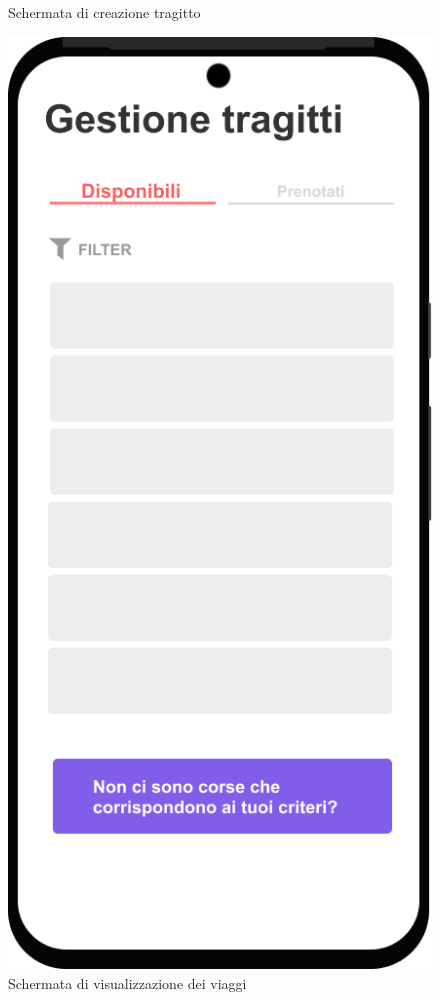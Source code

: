 \begin{figure}[H]
\begin{minipage}{0.45\textwidth}
        \caption{Schermata di creazione tragitto}
        \label{mockUp:createTrip}
    \end{minipage}%
    \hfill
    \begin{minipage}{0.45\textwidth}
        \centering
        \includegraphics[width=\linewidth]{Images/Tragitti disponibili.png}
        \caption{Schermata di visualizzazione dei viaggi}
        \label{mockUp:viewTrips}
    \end{minipage}
\end{figure}
